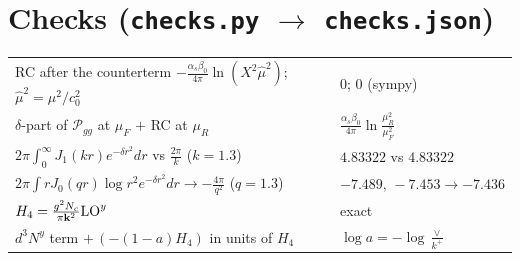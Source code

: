 \documentclass[10pt]{article}
\numberwithin{equation}{section}
\newcommand{\LO}{{\rm LO}}
\begin{document}
\section*{Checks (\texttt{checks.py} $\to$ \texttt{checks.json})}
\begin{center}\small
\begin{tabular}{@{}ll@{}}\toprule
RC after the counterterm $-\frac{\alpha_s\beta_0}{4\pi}\ln(X^2\hat\mu^2)$; $\hat\mu^2=\mu^2/c_0^2$ & $0$; $0$ (sympy)\\
$\delta$-part of $\mathcal P_{gg}$ at $\mu_F$ $+$ RC at $\mu_R$ & $\frac{\alpha_s\beta_0}{4\pi}\ln\frac{\mu_R^2}{\mu_F^2}$\\
$2\pi\int_0^\infty J_1(kr)e^{-\delta r^2}dr$ vs $\frac{2\pi}{k}$ ($k=1.3$) & $4.83322$ vs $4.83322$\\
$2\pi\int rJ_0(qr)\log r^2e^{-\delta r^2}dr\to-\frac{4\pi}{q^2}$ ($q=1.3$) & $-7.489,\,-7.453\to-7.436$\\
$H_4=\frac{g^2N_c}{\pi\mathbf k^2}\LO^y$ & exact\\
$d^3N^y$ term $+\,(-(1-a)H_4)$ in units of $H_4$ & $\log a=-\log\frac{\vee}{k^+}$\\\bottomrule
\end{tabular}
\end{center}
\end{document}

